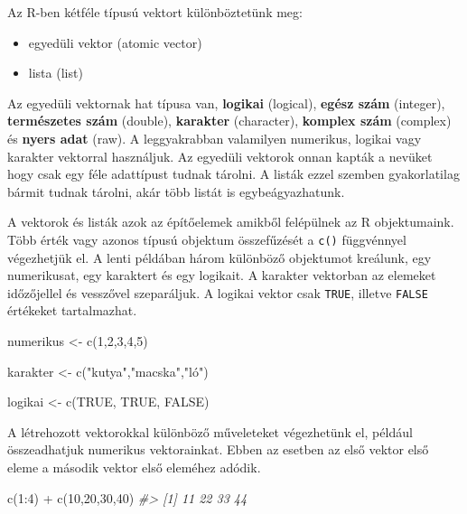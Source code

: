 \documentclass[
]{book}
\newenvironment{Shaded}{\begin{snugshade}}{\end{snugshade}}
\newcommand{\CommentTok}[1]{\textcolor[rgb]{0.56,0.35,0.01}{\textit{#1}}}
\newcommand{\ConstantTok}[1]{\textcolor[rgb]{0.00,0.00,0.00}{#1}}
\newcommand{\DecValTok}[1]{\textcolor[rgb]{0.00,0.00,0.81}{#1}}
\newcommand{\FunctionTok}[1]{\textcolor[rgb]{0.00,0.00,0.00}{#1}}
\newcommand{\NormalTok}[1]{#1}
\newcommand{\OtherTok}[1]{\textcolor[rgb]{0.56,0.35,0.01}{#1}}
\newcommand{\SpecialCharTok}[1]{\textcolor[rgb]{0.00,0.00,0.00}{#1}}
\newcommand{\StringTok}[1]{\textcolor[rgb]{0.31,0.60,0.02}{#1}}
\providecommand{\tightlist}{%
  \setlength{\itemsep}{0pt}\setlength{\parskip}{0pt}}
\begin{document}
Az R-ben kétféle típusú vektort különböztetünk meg:

\begin{itemize}
\tightlist
\item
  egyedüli vektor (atomic vector)
\item
  lista (list)
\end{itemize}

Az egyedüli vektornak hat típusa van, \textbf{logikai} (logical),
\textbf{egész szám} (integer), \textbf{természetes szám} (double),
\textbf{karakter} (character), \textbf{komplex szám} (complex) és
\textbf{nyers adat} (raw). A leggyakrabban valamilyen numerikus, logikai
vagy karakter vektorral használjuk. Az egyedüli vektorok onnan kapták a
nevüket hogy csak egy féle adattípust tudnak tárolni. A listák ezzel
szemben gyakorlatilag bármit tudnak tárolni, akár több listát is
egybeágyazhatunk.

A vektorok és listák azok az építőelemek amikből felépülnek az R
objektumaink. Több érték vagy azonos típusú objektum összefűzését a
\texttt{c()} függvénnyel végezhetjük el. A lenti példában három
különböző objektumot kreálunk, egy numerikusat, egy karaktert és egy
logikait. A karakter vektorban az elemeket időzőjellel és vesszővel
szeparáljuk. A logikai vektor csak \texttt{TRUE}, illetve \texttt{FALSE}
értékeket tartalmazhat.

\begin{Shaded}
\begin{Highlighting}[]
\NormalTok{numerikus }\OtherTok{\textless{}{-}} \FunctionTok{c}\NormalTok{(}\DecValTok{1}\NormalTok{,}\DecValTok{2}\NormalTok{,}\DecValTok{3}\NormalTok{,}\DecValTok{4}\NormalTok{,}\DecValTok{5}\NormalTok{)}

\NormalTok{karakter }\OtherTok{\textless{}{-}} \FunctionTok{c}\NormalTok{(}\StringTok{"kutya"}\NormalTok{,}\StringTok{"macska"}\NormalTok{,}\StringTok{"ló"}\NormalTok{)}

\NormalTok{logikai }\OtherTok{\textless{}{-}} \FunctionTok{c}\NormalTok{(}\ConstantTok{TRUE}\NormalTok{, }\ConstantTok{TRUE}\NormalTok{, }\ConstantTok{FALSE}\NormalTok{)}
\end{Highlighting}
\end{Shaded}

A létrehozott vektorokkal különböző műveleteket végezhetünk el, például
összeadhatjuk numerikus vektorainkat. Ebben az esetben az első vektor
első eleme a második vektor első eleméhez adódik.

\begin{Shaded}
\begin{Highlighting}[]
\FunctionTok{c}\NormalTok{(}\DecValTok{1}\SpecialCharTok{:}\DecValTok{4}\NormalTok{) }\SpecialCharTok{+} \FunctionTok{c}\NormalTok{(}\DecValTok{10}\NormalTok{,}\DecValTok{20}\NormalTok{,}\DecValTok{30}\NormalTok{,}\DecValTok{40}\NormalTok{)}
\CommentTok{\#\textgreater{} [1] 11 22 33 44}
\end{Highlighting}
\end{Shaded}
\end{document}
